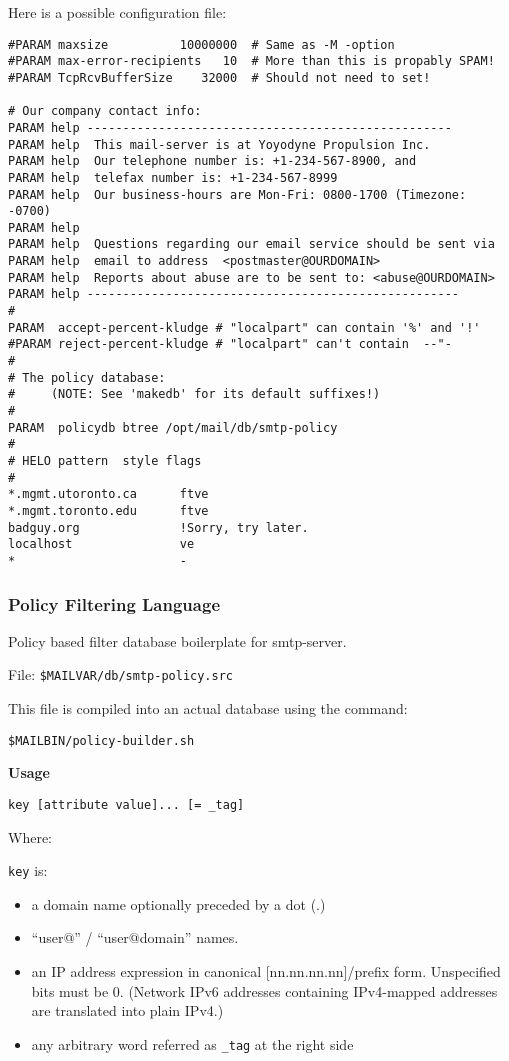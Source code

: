 Here is a possible configuration file:

\begin{tscreen}
\begin{verbatim}
#PARAM maxsize          10000000  # Same as -M -option
#PARAM max-error-recipients   10  # More than this is propably SPAM! 
#PARAM TcpRcvBufferSize    32000  # Should not need to set!

# Our company contact info:
PARAM help ---------------------------------------------------
PARAM help  This mail-server is at Yoyodyne Propulsion Inc. 
PARAM help  Our telephone number is: +1-234-567-8900, and 
PARAM help  telefax number is: +1-234-567-8999
PARAM help  Our business-hours are Mon-Fri: 0800-1700 (Timezone: -0700) 
PARAM help
PARAM help  Questions regarding our email service should be sent via 
PARAM help  email to address  <postmaster@OURDOMAIN>
PARAM help  Reports about abuse are to be sent to: <abuse@OURDOMAIN> 
PARAM help ----------------------------------------------------
#
PARAM  accept-percent-kludge # "localpart" can contain '%' and '!' 
#PARAM reject-percent-kludge # "localpart" can't contain  --"-
#
# The policy database:
#     (NOTE: See 'makedb' for its default suffixes!)
#
PARAM  policydb btree /opt/mail/db/smtp-policy
#
# HELO pattern  style flags
#
*.mgmt.utoronto.ca      ftve
*.mgmt.toronto.edu      ftve
badguy.org              !Sorry, try later.
localhost               ve
*                       -
\end{verbatim}
\end{tscreen}





\subsubsection{Policy Filtering Language}



Policy based filter database boilerplate for smtp-server.

File:  {\tt \$MAILVAR/db/smtp-policy.src}

This file is compiled into an actual database using the command:

{\tt \$MAILBIN/policy-builder.sh}

{\bf Usage}

{\tt  key [attribute value]... [= \_tag]}

Where:

{\tt key} is: 

\begin{itemize}
\item a domain name optionally preceded by a dot (.)
\item ``user@'' / ``user@domain'' names.
\item an IP address expression in canonical [nn.nn.nn.nn]/prefix form. 
Unspecified bits must be 0. (Network IPv6 addresses containing IPv4-mapped 
addresses are translated into plain IPv4.)
\item any arbitrary word referred as {\tt \_tag} at the right side
\end{itemize}

